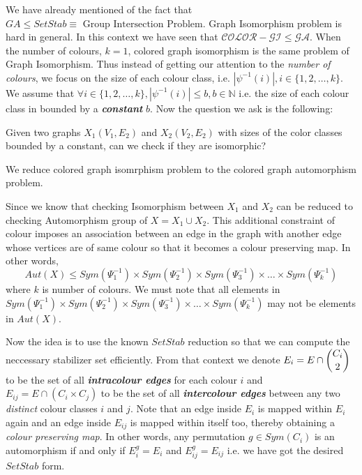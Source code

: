 We have already mentioned of the fact that $GA\leq SetStab\equiv\text{ Group Intersection Problem}$. Graph Isomorphism problem is hard in general. In this context we have seen that $\mathcal{COLOR-GI}\leq \mathcal{GA}$. When the number of colours, $k=1$, colored graph isomorphism is the same problem of Graph Isomorphism. Thus instead of getting our attention to the \emph{number of colours}, we focus on the size of each colour class, i.e. $|\psi^{-1}(i)|, i\in \{1,2,\ldots,k\}$. We assume that $\forall i\in\{1,2,\ldots,k\}, |\psi^{-1}(i)|\leq b, b\in \mathbb{N}$ i.e. the size of each colour class in bounded by a {\bf \emph{constant}} $b$. Now the question we ask is the following:
\begin{problem}
	Given two graphs $X_1(V_1,E_2)$ and $X_2(V_2,E_2)$ with sizes of the color classes bounded by a constant, can we check if they are isomorphic?
\end{problem}

We reduce colored graph isomrphism problem to the colored graph automorphism problem.

Since we know that checking Isomorphism between $X_1$ and $X_2$ can be reduced to checking Automorphism group of $X = X_1 \cup X_2$. This additional constraint of colour imposes an association between an edge in the graph with another edge whose vertices are of same colour so that it becomes a colour preserving map. In other words,
\begin{equation*}
	Aut(X)\leq Sym(\Psi^{-1}_1) \times Sym(\Psi^{-1}_2) \times Sym(\Psi^{-1}_3) \times \ldots \times Sym(\Psi^{-1}_k)
\end{equation*}
where $k$ is number of colours. We must note that all elements in $Sym(\Psi^{-1}_1) \times Sym(\Psi^{-1}_2) \times Sym(\Psi^{-1}_3) \times \ldots \times Sym(\Psi^{-1}_k)$ may not be elements in $Aut(X)$. 


Now the idea is to use the known $SetStab$ reduction so that we can compute the neccessary stabilizer set efficiently. From that context we denote $E_i = E\cap \dbinom{C_i}{2}$ to be the set of all {\bf \emph{intracolour edges}} for each colour $i$ and $E_{ij} = E\cap (C_i\times C_j)$ to be the set of all {\bf \emph{intercolour edges}} between any two \emph{distinct} colour classes $i$ and $j$. Note that an edge inside $E_i$ is mapped within $E_i$ again and an edge inside $E_{ij}$ is mapped within itself too, thereby obtaining a \emph{colour preserving map}. In other words, any permutation $g \in Sym(C_i)$ is an automorphism if and only if $E_i^g = E_i$ and $E_{ij}^g = E_{ij}$ i.e. we have got the desired $SetStab$ form.


